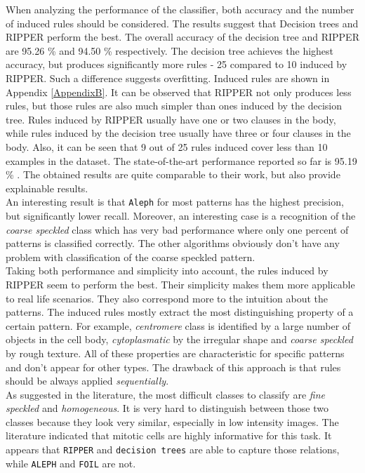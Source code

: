When analyzing the performance of the classifier, both accuracy and the number of induced rules should be considered. The results suggest that Decision trees and RIPPER perform the best. The overall accuracy of the decision tree and RIPPER are 95.26 \% and 94.50 \% respectively. The decision tree achieves the highest accuracy, but produces significantly  more rules - 25 compared to 10 induced by RIPPER. Such a difference suggests  overfitting. Induced rules are shown in Appendix \ref{AppendixB}. It can be observed that RIPPER not only produces less rules, but those rules are also much simpler than ones induced by the decision tree. Rules induced by RIPPER usually have one or two clauses in the body, while rules induced by the decision tree usually have three or four clauses in the body. Also, it can be seen that 9 out of 25 rules induced cover less than 10 examples in the dataset. The state-of-the-art performance reported so far is 95.19 \% \cite{Wiliem}. The obtained results are quite comparable to their work, but also provide explainable results.\\

An interesting result is that \texttt{Aleph} for most patterns has the highest precision, but significantly lower recall. Moreover, an interesting case is a recognition of the \textit{coarse speckled} class which has very bad performance where only one percent of patterns is classified correctly. The other algorithms obviously don't have any problem with classification of the coarse speckled pattern. \\

Taking both performance and simplicity into account, the rules induced by RIPPER seem to perform the best. Their simplicity makes them more applicable to real life scenarios. They also correspond more to the intuition about the patterns. The induced rules mostly extract the most distinguishing property of a certain pattern. For example, \textit{centromere} class is identified by a large number of objects in the cell body, \textit{cytoplasmatic} by the irregular shape and \textit{coarse speckled} by rough texture. All of these properties are characteristic for specific patterns and don't appear for other types. The drawback of this approach is that rules should be always applied \textit{sequentially}. \\

As suggested in the literature, the most difficult classes to classify are \textit{fine speckled} and \textit{homogeneous}. It is very hard to distinguish between those two classes because they look very similar, especially in low intensity images. The literature indicated that mitotic cells are highly informative for this task. It appears that  \texttt{RIPPER} and \texttt{decision trees} are able to capture those relations, while \texttt{ALEPH} and \texttt{FOIL} are not. \\

